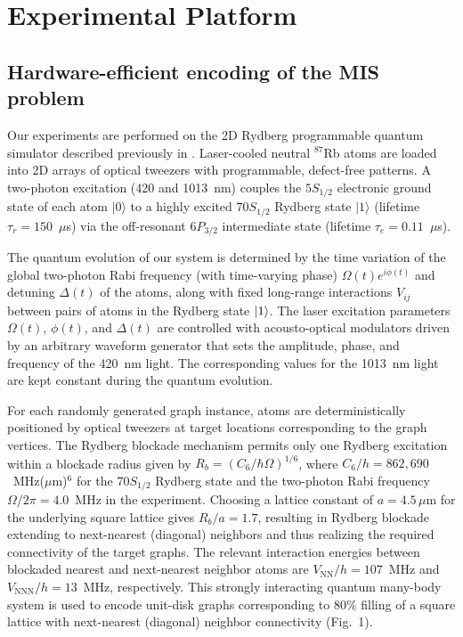 \documentclass[twocolumn,amssymb,secnumarabic, prl, aps, nofootinbib]{revtex4-1}
\begin{document}
\section{Experimental Platform \label{Sec:expt}}

\subsection{Hardware-efficient encoding of the MIS problem}

Our experiments are performed on the 2D Rydberg programmable quantum simulator described previously in \cite{ebadi_quantum_2020}. Laser-cooled neutral $^{87}$Rb atoms are loaded into 2D arrays of optical tweezers with programmable, defect-free patterns. A two-photon excitation (420 and 1013~nm) couples the $5S_{1/2}$ electronic ground state of each atom $|0\rangle$ to a highly excited $70S_{1/2}$ Rydberg state $|1\rangle$ (lifetime $\tau_r=150$~$\mu$s) via the off-resonant $6P_{3/2}$ intermediate state (lifetime $\tau_e=0.11$~$\mu$s). 

The quantum evolution of our system is determined by the time variation of the global two-photon Rabi frequency (with time-varying phase) $\Omega(t)e^{i\phi(t)}$ and detuning $\Delta(t)$ of the atoms, along with fixed long-range interactions $V_{ij}$ between pairs of atoms in the Rydberg state $\ket{1}$. The laser excitation parameters $\Omega(t)$, $\phi(t)$, and $\Delta(t)$ are controlled with acousto-optical modulators driven by an arbitrary waveform generator that sets the amplitude, phase, and frequency of the 420~nm light. The corresponding values for the 1013~nm light are kept constant during the quantum evolution.

For each randomly generated graph instance, atoms are deterministically positioned by optical tweezers at target locations corresponding to the graph vertices. The Rydberg blockade mechanism permits only one Rydberg excitation within a blockade radius given by $R_b = (C_6/\hbar \Omega)^{1/6}$, where $C_6/h = 862,690$~MHz($\mu$m)$^6$ for the  $70S_{1/2}$ Rydberg state and the two-photon Rabi frequency $\Omega/ 2\pi =4.0$~MHz in the experiment. Choosing a lattice constant of $a = 4.5\,\mu$m for the underlying square lattice gives $R_b/a = 1.7$, resulting in Rydberg blockade extending to next-nearest (diagonal) neighbors and thus realizing the required connectivity of the target graphs. The relevant interaction energies between blockaded nearest and next-nearest neighbor atoms are $V_{\text{NN}}/ h=107$~MHz and $V_{\text{NNN}}/ h=13$~MHz, respectively. This strongly interacting quantum many-body system is used to encode unit-disk graphs corresponding to 80\% filling of a square lattice with next-nearest (diagonal) neighbor connectivity (Fig.~1). 
\end{document}
